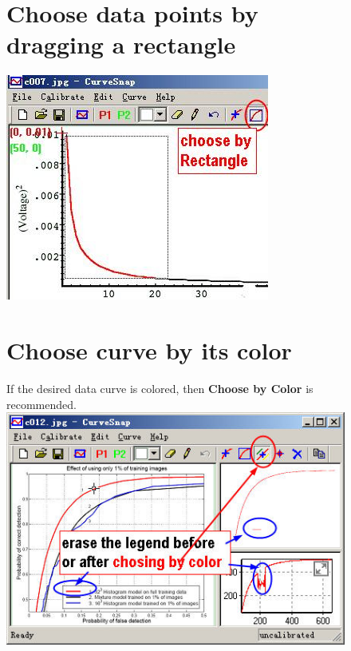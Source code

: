 \documentclass[12pt]{article}
\begin{document}
\begin{figure}[ht!]
\section{Choose data points by dragging a rectangle}
  \center \includegraphics{./tut_files/11_choose_rect.jpg}
\end{figure}

\begin{figure}[ht!]
\section{Choose curve by its color}
  If the desired data curve is colored, then \textbf{Choose by Color} is recommended.
  \center \includegraphics{./tut_files/12_choose_by_color.jpg}
\end{figure}
\end{document}
